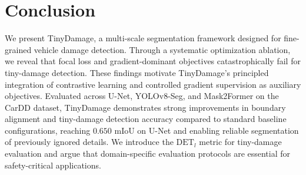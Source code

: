 \documentclass[10pt,twocolumn]{article}
\begin{document}
\section{Conclusion}
\label{sec:conclusion}

We present TinyDamage, a multi-scale segmentation framework designed for fine-grained vehicle damage detection. Through a systematic optimization ablation, we reveal that focal loss and gradient-dominant objectives catastrophically fail for tiny-damage detection. These findings motivate TinyDamage's principled integration of contrastive learning and controlled gradient supervision as auxiliary objectives. Evaluated across U-Net, YOLOv8-Seg, and Mask2Former on the CarDD dataset, TinyDamage demonstrates strong improvements in boundary alignment and tiny-damage detection accuracy compared to standard baseline configurations, reaching $0.650$ mIoU on U-Net and enabling reliable segmentation of previously ignored details. We introduce the $\text{DET}_l$ metric for tiny-damage evaluation and argue that domain-specific evaluation protocols are essential for safety-critical applications.
\end{document}
